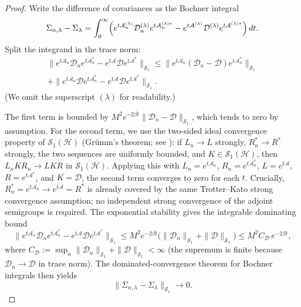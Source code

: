 \begin{proof}
Write the difference of covariances as the Bochner integral
\begin{equation}
  \Sigma_{n,\lambda}-\Sigma_\lambda
  =\int_0^\infty\Bigl(e^{t\mathcal{A}_n^{(\lambda)}}\mathcal{D}_n^{(\lambda)}e^{t\mathcal{A}_n^{(\lambda)*}}
    -e^{t\mathcal{A}^{(\lambda)}}\mathcal{D}^{(\lambda)}e^{t\mathcal{A}^{(\lambda)*}}\Bigr)\,dt.
\end{equation}
Split the integrand in the trace norm:
\begin{multline}
  \bigl\|e^{t\mathcal{A}_n}\mathcal{D}_ne^{t\mathcal{A}_n^*}
    -e^{t\mathcal{A}}\mathcal{D}e^{t\mathcal{A}^*}\bigr\|_{\mathcal{S}_1}
  \le\bigl\|e^{t\mathcal{A}_n}(\mathcal{D}_n-\mathcal{D})e^{t\mathcal{A}_n^*}\bigr\|_{\mathcal{S}_1}\\
  +\bigl\|e^{t\mathcal{A}_n}\mathcal{D}e^{t\mathcal{A}_n^*}
    -e^{t\mathcal{A}}\mathcal{D}e^{t\mathcal{A}^*}\bigr\|_{\mathcal{S}_1}.
\end{multline}
(We omit the superscript $(\lambda)$ for readability.)

The first term is bounded by $M^2e^{-2\beta t}\|\mathcal{D}_n-\mathcal{D}\|_{\mathcal{S}_1}$, which tends to zero by assumption.  For the second term, we use the two-sided ideal convergence property of $\mathcal{S}_1(\mathcal{H})$ (Gr\"umm's theorem; see \cite{simon2005trace}): if $L_n\to L$ strongly, $R_n^*\to R^*$ strongly, the two sequences are uniformly bounded, and $K\in\mathcal{S}_1(\mathcal{H})$, then $L_nKR_n\to LKR$ in $\mathcal{S}_1(\mathcal{H})$.  Applying this with $L_n=e^{t\mathcal{A}_n}$, $R_n=e^{t\mathcal{A}_n^*}$, $L=e^{t\mathcal{A}}$, $R=e^{t\mathcal{A}^*}$, and $K=\mathcal{D}$, the second term converges to zero for each $t$.  Crucially, $R_n^*=e^{t\mathcal{A}_n}\to e^{t\mathcal{A}}=R^*$ is already covered by the same Trotter--Kato strong convergence assumption; no independent strong convergence of the adjoint semigroups is required.  The exponential stability gives the integrable dominating bound
\begin{equation}
  \bigl\|e^{t\mathcal{A}_n}\mathcal{D}_ne^{t\mathcal{A}_n^*}
    -e^{t\mathcal{A}}\mathcal{D}e^{t\mathcal{A}^*}\bigr\|_{\mathcal{S}_1}
  \le M^2e^{-2\beta t}\bigl(\|\mathcal{D}_n\|_{\mathcal{S}_1}+\|\mathcal{D}\|_{\mathcal{S}_1}\bigr)
  \le M^2C_{\mathcal{D}}\,e^{-2\beta t},
\end{equation}
where $C_{\mathcal{D}}:=\sup_n\|\mathcal{D}_n\|_{\mathcal{S}_1}+\|\mathcal{D}\|_{\mathcal{S}_1}<\infty$ (the supremum is finite because $\mathcal{D}_n\to\mathcal{D}$ in trace norm).  The dominated-convergence theorem for Bochner integrals then yields
\begin{equation}
  \|\Sigma_{n,\lambda}-\Sigma_\lambda\|_{\mathcal{S}_1}\to0.
\end{equation}


\end{proof}
